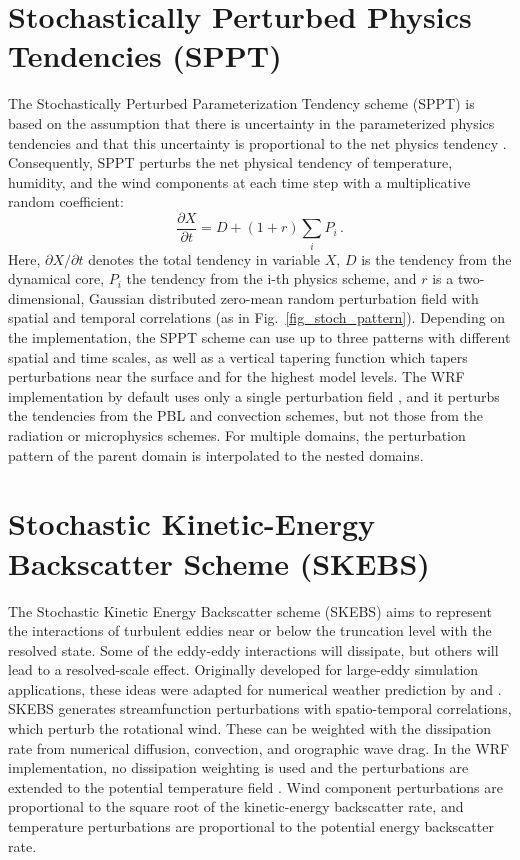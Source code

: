 \section {Stochastically Perturbed Physics Tendencies (SPPT)}
The Stochastically Perturbed Parameterization Tendency scheme
(SPPT) is based on the assumption that there is uncertainty
in the parameterized physics tendencies and that this 
uncertainty is proportional to the net physics tendency \citep{Bu99,Pa09}.
Consequently, SPPT perturbs the net physical tendency of temperature, 
humidity, and the wind components at each time step with a multiplicative 
random coefficient:
\begin{equation}
   \frac{\partial X}{\partial t}= D + (1+ r) \sum_i P_i \,.
\end{equation}
Here, ${\partial X}/{\partial t}$ denotes the total tendency in variable $X$, 
$D$ is the tendency from the dynamical core, 
$P_i$ the tendency from the i-th physics scheme, 
and $r$ is a two-dimensional, Gaussian distributed zero-mean random
perturbation field with spatial and temporal correlations (as in Fig.\, \ref{fig_stoch_pattern}).
Depending on
the implementation, the SPPT scheme can use up to three patterns with
different spatial and time scales, as well as a vertical tapering function which 
tapers perturbations near the surface and for the highest model levels.
The WRF implementation by default uses only a single perturbation field \citep{Be15},
and it perturbs the tendencies from the PBL and convection schemes, but not those from 
the radiation or microphysics schemes. For multiple domains, the perturbation pattern of the 
parent domain is interpolated to the nested domains.

\section{Stochastic Kinetic-Energy Backscatter Scheme (SKEBS)}
The Stochastic Kinetic Energy Backscatter scheme (SKEBS) aims to represent
the interactions of turbulent eddies near or below the
truncation level with the resolved state. Some of the eddy-eddy interactions
will dissipate, but others will lead to a resolved-scale effect.
Originally developed for large-eddy simulation applications, these ideas were 
adapted for numerical weather prediction by
\citet{Sh05} and \citet{Be09}.
SKEBS generates streamfunction perturbations with spatio-temporal
correlations, which perturb the rotational wind. These can be weighted
with the dissipation rate from numerical diffusion, convection, and
orographic wave drag.
In the WRF implementation, no dissipation weighting is used and the 
perturbations are extended to the potential temperature field \citep{Be11}.
Wind component perturbations are proportional to the square
root of the kinetic-energy backscatter rate, and temperature
perturbations are proportional to the potential energy backscatter rate.

